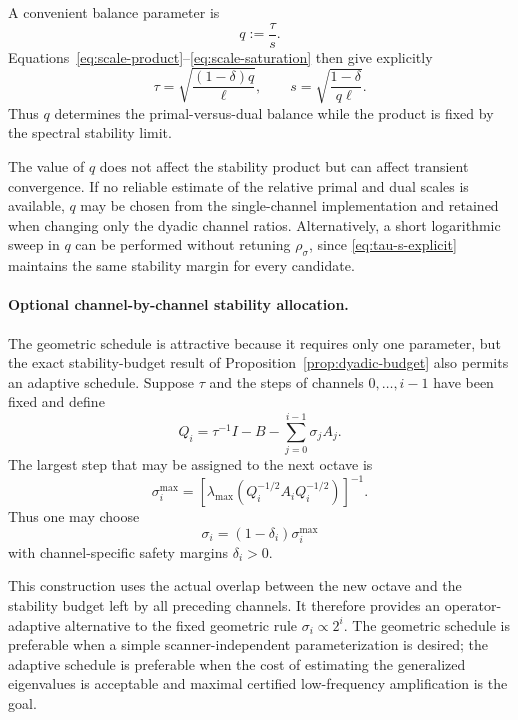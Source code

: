 \documentclass{article}
\begin{document}
A convenient balance parameter is
\[
q:=\frac{\tau}{s}.
\]
Equations~\eqref{eq:scale-product}--\eqref{eq:scale-saturation}
then give explicitly
\begin{equation}
\label{eq:tau-s-explicit}
\tau
=
\sqrt{
\frac{(1-\delta)q}{\ell}
},
\qquad
s
=
\sqrt{
\frac{1-\delta}{q\ell}
}.
\end{equation}
Thus $q$ determines the primal-versus-dual balance while the product
is fixed by the spectral stability limit.

The value of $q$ does not affect the stability product but can affect
transient convergence.  If no reliable estimate of the relative
primal and dual scales is available, $q$ may be chosen from the
single-channel implementation and retained when changing only the
dyadic channel ratios.  Alternatively, a short logarithmic sweep in
$q$ can be performed without retuning $\rho_\sigma$, since
\eqref{eq:tau-s-explicit} maintains the same stability margin for
every candidate.

\paragraph{Optional channel-by-channel stability allocation.}
The geometric schedule is attractive because it requires only one
parameter, but the exact stability-budget result of
Proposition~\ref{prop:dyadic-budget} also permits an adaptive
schedule.  Suppose $\tau$ and the steps of channels
$0,\ldots,i-1$ have been fixed and define
\[
Q_i
=
\tau^{-1}I
-
B
-
\sum_{j=0}^{i-1}\sigma_jA_j.
\]
The largest step that may be assigned to the next octave is
\[
\sigma_i^{\max}
=
\left[
\lambda_{\max}
\left(
Q_i^{-1/2}A_iQ_i^{-1/2}
\right)
\right]^{-1}.
\]
Thus one may choose
\begin{equation}
\label{eq:adaptive-octave-step}
\sigma_i
=
(1-\delta_i)\sigma_i^{\max}
\end{equation}
with channel-specific safety margins $\delta_i>0$.

This construction uses the actual overlap between the new octave and
the stability budget left by all preceding channels.  It therefore
provides an operator-adaptive alternative to the fixed geometric rule
$\sigma_i\propto2^i$.  The geometric schedule is preferable when a
simple scanner-independent parameterization is desired; the adaptive
schedule is preferable when the cost of estimating the generalized
eigenvalues is acceptable and maximal certified low-frequency
amplification is the goal.
\end{document}
